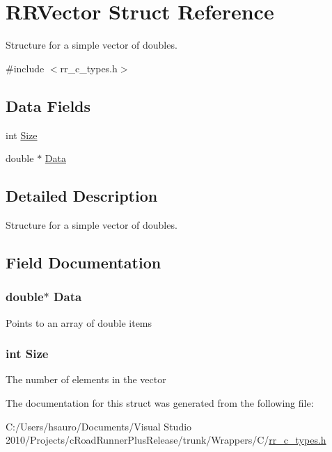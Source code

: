 \hypertarget{struct_r_r_vector}{
\section{\-R\-R\-Vector \-Struct \-Reference}
\label{struct_r_r_vector}
}


\-Structure for a simple vector of doubles.  




{\ttfamily \#include $<$rr\-\_\-c\-\_\-types.\-h$>$}

\subsection*{\-Data \-Fields}
\begin{DoxyCompactItemize}
\item 
int \hyperlink{struct_r_r_vector_af06eb7b9b70be91dadd4f12ebcaed796}{\-Size}
\item 
double $\ast$ \hyperlink{struct_r_r_vector_a7c5cbda3aa940f4b0d6e8a1679307dfc}{\-Data}
\end{DoxyCompactItemize}


\subsection{\-Detailed \-Description}
\-Structure for a simple vector of doubles. 

\subsection{\-Field \-Documentation}
\hypertarget{struct_r_r_vector_a7c5cbda3aa940f4b0d6e8a1679307dfc}{
\subsubsection[{\-Data}]{\setlength{\rightskip}{0pt plus 5cm}double$\ast$ {\bf \-Data}}}
\label{struct_r_r_vector_a7c5cbda3aa940f4b0d6e8a1679307dfc}
\-Points to an array of double items \hypertarget{struct_r_r_vector_af06eb7b9b70be91dadd4f12ebcaed796}{
\subsubsection[{\-Size}]{\setlength{\rightskip}{0pt plus 5cm}int {\bf \-Size}}}
\label{struct_r_r_vector_af06eb7b9b70be91dadd4f12ebcaed796}
\-The number of elements in the vector 

\-The documentation for this struct was generated from the following file\-:\begin{DoxyCompactItemize}
\item 
\-C\-:/\-Users/hsauro/\-Documents/\-Visual Studio 2010/\-Projects/c\-Road\-Runner\-Plus\-Release/trunk/\-Wrappers/\-C/\hyperlink{rr__c__types_8h}{rr\-\_\-c\-\_\-types.\-h}\end{DoxyCompactItemize}
